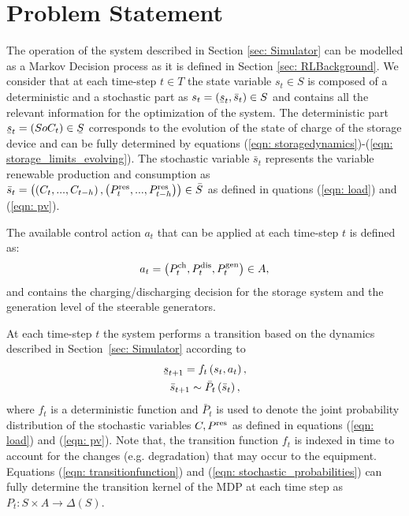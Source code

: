 \documentclass{article}
\newcommand{\ubar}[1]{\text{\b{$#1$}}}
\begin{document}
\section{Problem Statement} \label{sec: ProblemStatement}

    The operation of the system described in Section \ref{sec: Simulator} can be modelled as a Markov Decision process as it is defined in Section \ref{sec: RLBackground}. We consider that at each time-step $t \in T$ the state variable $s_t \in S$ is composed of a deterministic and a stochastic part as $s_t = \left(\ubar{s}_t, \bar{s}_t\right) \in S$ and contains all the relevant information for the optimization of the system. The deterministic part $\ubar{s}_t = \left(SoC_{t}\right) \in \ubar{S}$ corresponds to the evolution of the state of charge of the storage device and can be fully determined by equations (\ref{eqn: storagedynamics})-(\ref{eqn: storage_limits_evolving}). The stochastic variable $\bar{s}_t$ represents the variable renewable production and consumption as $\bar{s}_t = \left(\left(C_t,...,C_{t-h}\right), \left(P^\text{res}_t,...,P^\text{res}_{t-h} \right)\right) \in \bar{S}$ as defined in quations (\ref{eqn: load}) and (\ref{eqn: pv}).
    
    The available control action $a_t$ that can be applied at each time-step $t$ is defined as:
    \begin{gather}
    a_t= \left(P^{\text{ch}}_{t}, P^{\text{dis}}_{t}, P^\text{gen}_{t} \right) \in A,
    \end{gather}
    and contains the charging/discharging decision for the storage system and the generation level of the steerable generators.
    
    At each time-step $t$ the system performs a transition based on the dynamics described in Section~\ref{sec: Simulator} according to
    \begin{gather}
    \ubar{s}_{t+1} = f_{t}\left(s_t, a_t\right), \label{eqn: transitionfunction}\\
    \bar{s}_{t+1} \sim \bar{P}_{t}\left(\bar{s}_t\right)\label{eqn: stochastic_probabilities},
    \end{gather}
    where $f_{t}$ is a deterministic function and $\bar{P}_{t}$ is used to denote the joint probability distribution of the stochastic variables $C, P^\text{res}$ as defined in equations (\ref{eqn: load}) and (\ref{eqn: pv}). Note that, the transition function $f_{t}$ is indexed in time to account for the changes (e.g. degradation) that may occur to the equipment. Equations (\ref{eqn: transitionfunction}) and (\ref{eqn: stochastic_probabilities}) can fully determine the transition kernel of the MDP at each time step as $P_t: S \times A \rightarrow \Delta(S)$.
    
\end{document}
